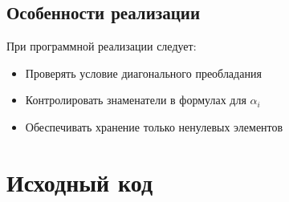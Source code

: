 \subsection*{Особенности реализации}
При программной реализации следует:
\begin{itemize}
\item Проверять условие диагонального преобладания
\item Контролировать знаменатели в формулах для $\alpha_i$
\item Обеспечивать хранение только ненулевых элементов
\end{itemize}

\section*{Исходный код}


